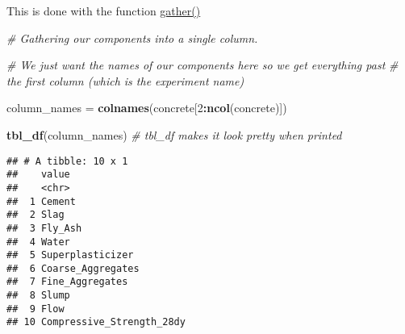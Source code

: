 \documentclass[]{article}
\newenvironment{Shaded}{\begin{snugshade}}{\end{snugshade}}
\newcommand{\CommentTok}[1]{\textcolor[rgb]{0.56,0.35,0.01}{\textit{#1}}}
\newcommand{\DecValTok}[1]{\textcolor[rgb]{0.00,0.00,0.81}{#1}}
\newcommand{\KeywordTok}[1]{\textcolor[rgb]{0.13,0.29,0.53}{\textbf{#1}}}
\newcommand{\NormalTok}[1]{#1}
\newcommand{\OperatorTok}[1]{\textcolor[rgb]{0.81,0.36,0.00}{\textbf{#1}}}
\newcommand{\StringTok}[1]{\textcolor[rgb]{0.31,0.60,0.02}{#1}}
\begin{document}
This is done with the function
\href{https://www.rdocumentation.org/packages/tidyr/versions/0.8.1/topics/gather}{gather()}

\begin{Shaded}
\begin{Highlighting}[]
  \CommentTok{# Gathering our components into a single column.}

  \CommentTok{# We just want the names of our components here so we get everything past}
  \CommentTok{# the first column (which is the experiment name)}

\NormalTok{  column_names  =}\StringTok{ }\KeywordTok{colnames}\NormalTok{(concrete[}\DecValTok{2}\OperatorTok{:}\KeywordTok{ncol}\NormalTok{(concrete)])   }

  \KeywordTok{tbl_df}\NormalTok{(column_names) }\CommentTok{# tbl_df makes it look pretty when printed}
\end{Highlighting}
\end{Shaded}

\begin{verbatim}
## # A tibble: 10 x 1
##    value                    
##    <chr>                    
##  1 Cement                   
##  2 Slag                     
##  3 Fly_Ash                  
##  4 Water                    
##  5 Superplasticizer         
##  6 Coarse_Aggregates        
##  7 Fine_Aggregates          
##  8 Slump                    
##  9 Flow                     
## 10 Compressive_Strength_28dy
\end{verbatim}
\end{document}
